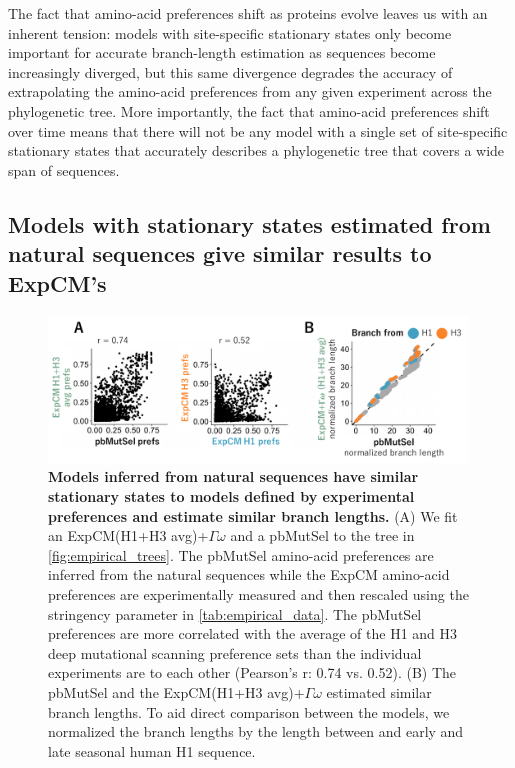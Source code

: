\documentclass[11pt]{article}
\begin{document}
The fact that amino-acid preferences shift as proteins evolve leaves us with an inherent tension: models with site-specific stationary states only become important for accurate branch-length estimation as sequences become increasingly diverged, but this same divergence degrades the accuracy of extrapolating the amino-acid preferences from any given experiment across the phylogenetic tree.
More importantly, the fact that amino-acid preferences shift over time means that there will not be any model with a single set of site-specific stationary states that accurately describes a phylogenetic tree that covers a wide span of sequences.

\subsection*{Models with stationary states estimated from natural sequences give similar results to ExpCM's}

\begin{figure}
\centerline{\includegraphics[width=0.99\textwidth]{figures/phylobayes.pdf}}
\caption{\label{fig:phylobayes}
\textbf{Models inferred from natural sequences have similar stationary states to models defined by experimental preferences and estimate similar branch lengths.}
(A) We fit an ExpCM(H1+H3 avg)+$\Gamma\omega$ and a pbMutSel to the tree in \ref{fig:empirical_trees}. 
The pbMutSel amino-acid preferences are inferred from the natural sequences while the ExpCM amino-acid preferences are experimentally measured and then rescaled using the stringency parameter in \ref{tab:empirical_data}. 
The pbMutSel preferences are more correlated with the average of the H1 and H3 deep mutational scanning preference sets than the individual experiments are to each other (Pearson's r: 0.74 vs. 0.52). 
(B) The pbMutSel and the ExpCM(H1+H3 avg)+$\Gamma\omega$ estimated similar branch lengths. 
To aid direct comparison between the models, we normalized the branch lengths by the length between and early and late seasonal human H1 sequence. 
}
\end{figure}
\end{document}
